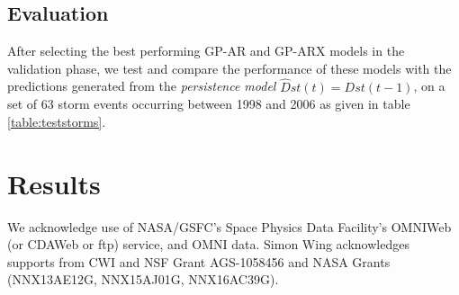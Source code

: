\documentclass[sw, draft]{AGUTeX}
\begin{document}
\begin{article}
\subsection*{Evaluation}

After selecting the best performing GP-AR and GP-ARX models in the validation phase, we test and compare the performance of these models with the predictions generated from the \emph{persistence model} $\hat{D}st(t) = Dst(t-1)$, on a set of 63 storm events occurring between 1998 and 2006 as given in table \ref{table:teststorms}.


\section{Results}\label{sec:res}


%
%
%
%
%

%

\begin{acknowledgments}
We acknowledge use of NASA/GSFC's Space Physics Data Facility's OMNIWeb (or CDAWeb or ftp) service, and OMNI data. Simon Wing acknowledges supports from CWI and NSF Grant AGS-1058456 and NASA Grants (NNX13AE12G, NNX15AJ01G, NNX16AC39G).
\end{acknowledgments}


\end{article}
\end{document}
